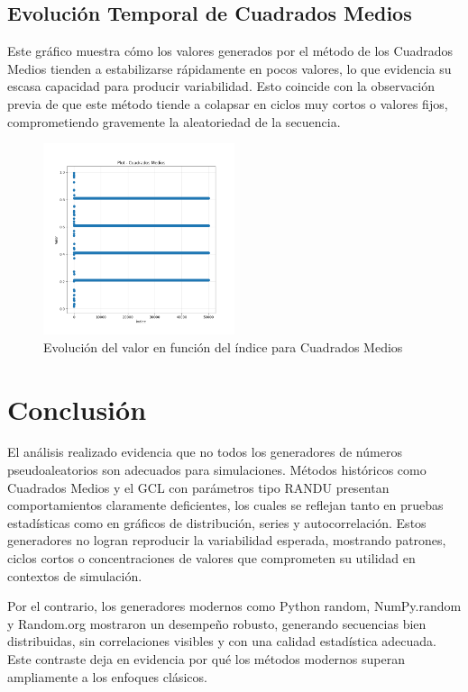 \documentclass{article}
\begin{document}
\subsection{Evolución Temporal de Cuadrados Medios}

Este gráfico muestra cómo los valores generados por el método de los Cuadrados Medios tienden a estabilizarse rápidamente en pocos valores, lo que evidencia su escasa capacidad para producir variabilidad. Esto coincide con la observación previa de que este método tiende a colapsar en ciclos muy cortos o valores fijos, comprometiendo gravemente la aleatoriedad de la secuencia.

\begin{figure}[H]
\centering
\includegraphics[width=0.5\textwidth]{Imagenes/plot_Cuadrados Medios.png}
\caption{Evolución del valor en función del índice para Cuadrados Medios}
\end{figure}

\section{Conclusión}
El análisis realizado evidencia que no todos los generadores de números pseudoaleatorios son adecuados para simulaciones. Métodos históricos como Cuadrados Medios y el GCL con parámetros tipo RANDU presentan comportamientos claramente deficientes, los cuales se reflejan tanto en pruebas estadísticas como en gráficos de distribución, series y autocorrelación. Estos generadores no logran reproducir la variabilidad esperada, mostrando patrones, ciclos cortos o concentraciones de valores que comprometen su utilidad en contextos de simulación.

Por el contrario, los generadores modernos como Python random, NumPy.random y Random.org mostraron un desempeño robusto, generando secuencias bien distribuidas, sin correlaciones visibles y con una calidad estadística adecuada. Este contraste deja en evidencia por qué los métodos modernos superan ampliamente a los enfoques clásicos.
\end{document}
